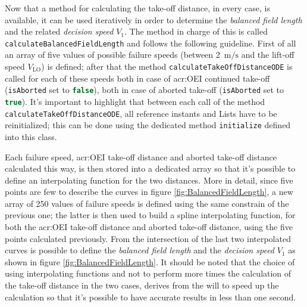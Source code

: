 \bigskip
\noindent
Now that a method for calculating the take-off distance, in every case, is available, it can be used iteratively in order to determine the \emph{balanced field length} and the related \emph{decision speed} $V_1$. The method in charge of this is called \lstinline[language=Java]!calculateBalancedFieldLength! and follows the following guideline.
%
First of all an array of five values of possible failure speeds (between 2~$\si{\meter\per\second}$ and the lift-off speed $V_{\text{LO}}$) is defined; after that the method \lstinline[language=Java]!calculateTakeOffDistanceODE! is called for each of these speeds both in case of \gls{acr:OEI} continued take-off (\lstinline[language=Java]!isAborted! set to \lstinline[language=Java]!false!), both in case of aborted take-off (\lstinline[language=Java]!isAborted! set to \lstinline[language=Java]!true!). It's important to highlight that between each call of the method \lstinline[language=Java]!calculateTakeOffDistanceODE!, all reference instants and \gls{List}s have to be reinitialized; this can be done using the dedicated method \lstinline[language=Java]!initialize! defined into this class.

\bigskip
\noindent
Each failure speed, \gls{acr:OEI} take-off distance and aborted take-off distance calculated this way, is then stored into a dedicated array so that it's possible to define an interpolating function for the two distances. More in detail, since five points are few to describe the curves in figure \ref{fig:BalancedFieldLength}, a new array of 250 values of failure speeds is defined using the same constrain of the previous one; the latter is then used to build a spline interpolating function, for both the \gls{acr:OEI} take-off distance and aborted take-off distance, using the five points calculated previously.
%
From the intersection of the last two interpolated curves is possible to define the \emph{balanced field length} and the \emph{decision speed} $V_1$ as shown in figure \ref{fig:BalancedFieldLength}. It should be noted that the choice of using interpolating functions and not to perform more times the calculation of the take-off distance in the two cases, derives from the will to speed up the calculation so that it's possible to have accurate results in less than one second. 

